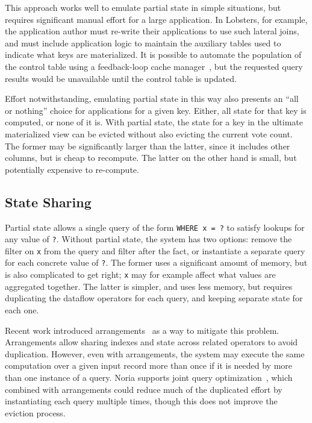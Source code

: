 This approach works well to emulate partial state in simple situations, but
requires significant manual effort for a large application. In Lobsters, for
example, the application author must re-write their applications to use such
lateral joins, and must include application logic to maintain the auxiliary
tables used to indicate what keys are materialized. It is possible to automate
the population of the control table using a feedback-loop cache
manager~\cite{dynamic-materialized-views}, but the requested query results would
be unavailable until the control table is updated.

Effort notwithstanding, emulating partial state in this way also presents an
``all or nothing'' choice for applications for a given key. Either, all state
for that key is computed, or none of it is. With partial state, the state for a
key in the ultimate materialized view can be evicted without also evicting the
current vote count. The former may be significantly larger than the latter,
since it includes other columns, but is cheap to recompute. The latter on the
other hand is small, but potentially expensive to re-compute.

\subsection{State Sharing}

Partial state allows a single query of the form \texttt{WHERE x = ?} to satisfy
lookups for any value of \texttt{?}. Without partial state, the system has two
options: remove the filter on \texttt{x} from the query and filter after the
fact, or instantiate a separate query for each concrete value of \texttt{?}. The
former uses a significant amount of memory, but is also complicated to get
right; \texttt{x} may for example affect what values are aggregated together.
The latter is simpler, and uses less memory, but requires duplicating the
dataflow operators for each query, and keeping separate state for each one.

Recent work introduced arrangements~\cite{arrangements} as a way to mitigate
this problem. Arrangements allow sharing indexes and state across related
operators to avoid duplication. However, even with arrangements, the system may
execute the same computation over a given input record more than once if it is
needed by more than one instance of a query. Noria supports joint query
optimization~\cite{noria}, which combined with arrangements could reduce much of
the duplicated effort by instantiating each query multiple times, though this
does not improve the eviction process.

